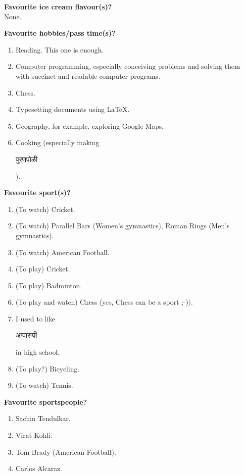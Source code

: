\documentclass[17pt]{extarticle}  %
\begin{document}
\begin{enumerate}
\begin{english}
\item\textbf{Favourite ice cream flavour(s)?}\\
None.

\item\textbf{Favourite hobbies/pass time(s)?}\\
\begin{enumerate}
\item Reading. This one is enough.
\item Computer programming, especially conceiving problems and solving them with succinct and readable computer programs.
\item Chess.
\item Typesetting documents using \LaTeX.
\item Geography, for example, exploring Google Maps.
\item Cooking (especially making \begin{marathi}पुरणपोळी\end{marathi}).
\end{enumerate}

\item\textbf{Favourite sport(s)?}\\
\begin{enumerate}
\item (To watch) Cricket.
\item (To watch) Parallel Bars (Women's gymnastics), Roman Rings (Men's gymnastics).
\item (To watch) American Football.
\item (To play) Cricket.
\item (To play) Badminton.
\item (To play and watch) Chess (yes, Chess can be a sport ;-)).
\item I used to like \begin{marathi}अप्पारप्पी\end{marathi} in high school.
\item (To play?) Bicycling.
\item (To watch) Tennis.
\end{enumerate}

\item\textbf{Favourite sportspeople?}\\
\begin{enumerate}
\item Sachin Tendulkar.
\item Virat Kohli.
\item Tom Brady (American Football).
\item Carlos Alcaraz.
\end{enumerate}



\end{english}
\end{enumerate}
\end{document}
